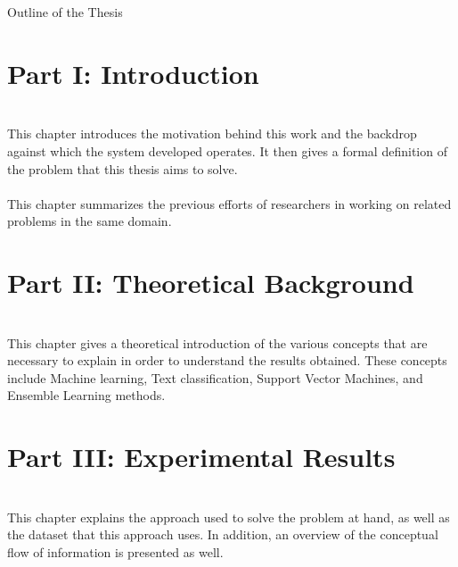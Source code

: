 \clearemptydoublepage

{}

\begin{center}
    \huge{Outline of the Thesis}
\end{center}

\section*{Part I: Introduction}

  \vspace{1mm}\\
\noindent This chapter introduces the motivation behind this work and the backdrop against which the system developed operates. It then gives a formal definition of the problem that this thesis aims to solve.\\

  \vspace{1mm}\\
\noindent This chapter summarizes the previous efforts of researchers in working on related problems in the same domain.\\

\section*{Part II: Theoretical Background}

  \vspace{1mm}\\
\noindent This chapter gives a theoretical introduction of the various concepts that are necessary to explain in order to understand the results obtained. These concepts include Machine learning, Text classification, Support Vector Machines, and Ensemble Learning methods.\\

\section*{Part III: Experimental Results}
  \vspace{1mm}\\
\noindent This chapter explains the approach used to solve the problem at hand, as well as the dataset that this approach uses. In addition, an overview of the conceptual flow of information is presented as well.\\

